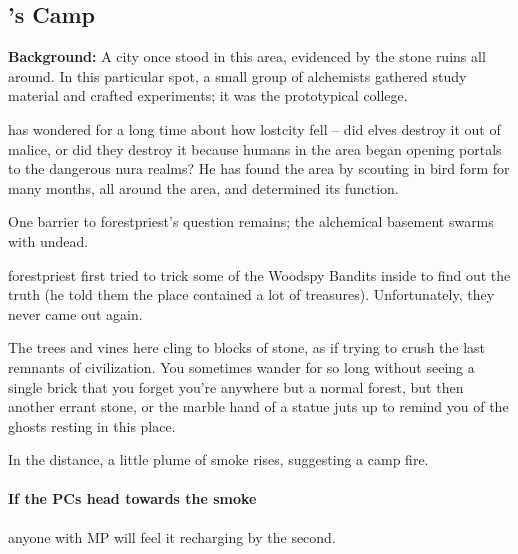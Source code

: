 \begin{multicols}{2}

\thenecromancer

\subsection{'s Camp}
\label{lostcity}

\textbf{Background:}
A city once stood in this area, evidenced by the stone ruins all around.
In this particular spot, a small group of alchemists gathered study material and crafted experiments; it was the prototypical \gls{college}.

 has wondered for a long time about how \gls{lostcity} fell -- did elves destroy it out of malice, or did they destroy it because humans in the area began opening portals to the dangerous nura realms?
He has found the area by scouting in bird form for many months, all around the area, and determined its function.

One barrier to \gls{forestpriest}'s question remains; the alchemical basement swarms with undead.

\Gls{forestpriest} first tried to trick some of the Woodspy Bandits inside to find out the truth (he told them the place contained a lot of treasures).
Unfortunately, they never came out again.

\begin{boxtext}

  The trees and vines here cling to blocks of stone, as if trying to crush the last remnants of civilization.
  You sometimes wander for so long without seeing a single brick that you forget you're anywhere but a normal forest, but then another errant stone, or the marble hand of a statue juts up to remind you of the ghosts resting in this place.

  In the distance, a little plume of smoke rises, suggesting a camp fire.

\end{boxtext}

\paragraph{If the PCs head towards the smoke}
anyone with MP will feel it recharging by the second.



\end{multicols}
